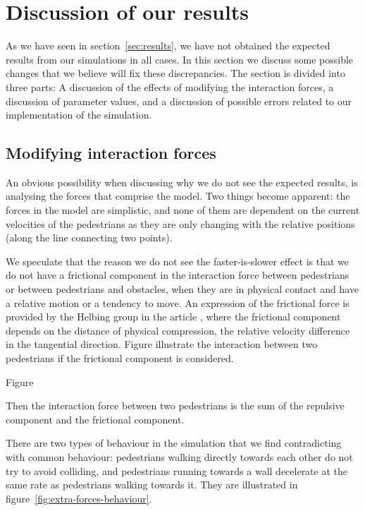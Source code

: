 \section{Discussion of our results}
\label{sec:discussion}
As we have seen in section~\ref{sec:results}, we have not obtained the 
expected results from our simulations in all cases. In this section we discuss 
some possible changes that we believe will fix these discrepancies.
The section is divided into three parts: A discussion of the effects of modifying  
the interaction forces, a discussion of parameter values, and a 
discussion of possible errors related to our implementation of the simulation.

\subsection{Modifying interaction forces}
An obvious possibility when discussing why we do not see the expected results, 
is analysing the forces that comprise the model. Two things become apparent: 
the forces in the model are simplistic, and none of them are dependent 
on the current velocities of the pedestrians as they are only changing with the relative 
positions (along the line connecting two points). 

We speculate that the reason we do not see the faster-is-slower effect is 
that we do not have a frictional component in the interaction force between pedestrians 
or between pedestrians and obstacles, when they are in physical contact and have a 
relative motion or a tendency to move. An expression of the frictional force is 
provided by the Helbing group in the article \cite{helbing00}, where the frictional component 
depends on the distance of physical compression, the relative velocity difference in 
the tangential direction. Figure  illustrate the interaction between two pedestrians 
if the frictional component is considered. 

Figure

Then the interaction force between two pedestrians is the sum of the repulsive component 
and the frictional component.

There are two types of behaviour in the simulation that we find contradicting 
with common behaviour: pedestrians walking directly towards each other 
do not try to avoid colliding, and pedestrians running towards a wall 
decelerate at the same rate as pedestrians walking towards it. They are illustrated in 
figure~\ref{fig:extra-forces-behaviour}.


